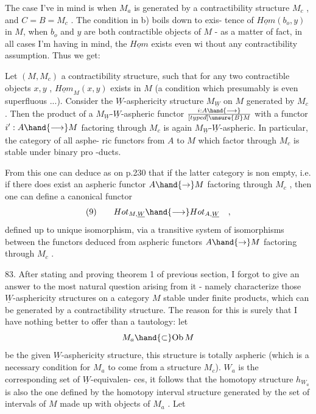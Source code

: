 
The case I've in mind is when $M_a$ is generated by a contractibility
structure $M_c$ , and $C=B = M_c$ . The condition in b) boils down to exis-%
tence of $\underline{Hom}(b_o,y)$ in $M$, when $b_o$ and $y$ are both contractible objects of $M$
- as a matter of fact, in all cases I'm having in mind,  the $\underline{Hom}$
exists even wi thout any contractibility assumption. Thus we get:

\hand{\uline{\textcolor{black}{Corollary}}} Let $(M,M_c)$ a contractibility structure, such that for any
two contractible objects $x,y$ , $\underline{Hom}_M(x,y)$ exists in $M$ (a condition which
presumably is even superfluous ...). Consider the $\underline{W}$-asphericity structure
$M_{\underline{W}}$ on $M$ generated by $M_c$ . Then the product of a $M_{\underline{W}}$-$\underline{W}$-aspheric functor
$i: A \hand{\longrightarrow} \over[typed]{\unsure{B}}{M}$ with a functor $i' : A \hand{\longrightarrow} M$ factoring through $M_c$ is again
$M_{\underline{W}}$-$\underline{W}$-aspheric. In particular, the category  of all asphe-%
ric functors from $A$ to $M$ which factor through $M_c$ is stable under binary pro%
-ducts.

From this one can deduce as on p.230 that if the latter category is
non empty, i.e. if there does exist an aspheric functor $A\hand{\to} M$ factoring
through $M_c$ , then one can define a canonical functor
\[ (9) \qquad Hot_{M,\underline{W}} \hand{\longrightarrow} Hot_{A,\underline{W}} \quad , \]
defined up to unique isomorphism, via a transitive system of isomorphisms
between the functors deduced from aspheric functors $A \hand{\to} M$ factoring
through $M_c$ .

83. After stating and proving theorem 1 of previous section, I forgot
to give an answer to the most natural question arising from it - namely
 characterize those $\underline{W}$-asphericity structures on a category $M$ stable under
finite products, which can be generated by a contractibility structure.
The reason for this is surely that I have nothing better to offer than a
tautology: let
\[ M_a \hand{\subset} \mathrm{Ob}\, M \]
be the given $\underline{W}$-asphericity structure,   this
structure is totally aspheric (which is a necessary condition for $M_a$ to
come from a structure $M_c$).  $W_a$ is the corresponding set of $\underline{W}$-equivalen-%
ces, it follows that the homotopy structure $h_{W_a}$ is also the one defined
by the homotopy interval structure  generated by the set  of intervals of $M$
made up with objects of $M_a$ . Let

